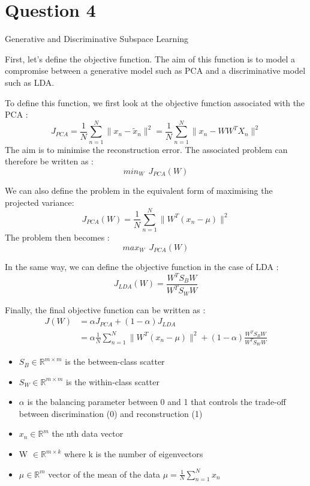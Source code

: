 
\section{Question 4} Generative and Discriminative Subspace Learning
\newline


First, let's define the objective function. The aim of this function is to model a compromise between a generative model such as PCA and a discriminative model such as LDA.

To define this function, we first look at the objective function associated with the PCA : 
$$ J_{PCA} = \frac{1}{N} \sum_{n = 1}^{N} {\lVert x_n - \tilde{x}_n \rVert ^2} = \frac{1}{N} \sum_{n = 1}^{N}{\lVert x_n - WW^TX_n \rVert^2} $$ 
The aim is to minimise the reconstruction error.  The associated problem can therefore be written as : 
$$ min_W\ \ J_{PCA}(W) $$

We can also define the problem in the equivalent form of maximising the projected variance:
$$ J_{PCA}(W) =  \frac{1}{N} \sum_{n = 1}^{N}{\lVert W^T(x_n - \mu) \rVert^2} $$
The problem then becomes : 
$$ max_W\ \ J_{PCA}(W) $$

In the same way, we can define the objective function in the case of LDA :
$$ J_{LDA}(W) = \dfrac{W^TS_BW}{W^TS_WW} $$

Finally, the final objective function can be written as :
\begin{align*}
	J(W) &= \alpha J_{PCA} + (1 - \alpha) J_{LDA} \\
	&= \alpha \frac{1}{N} \sum_{n = 1}^{N} \lVert W^T(x_n - \mu) \rVert^2 + (1 - \alpha) \frac{W^T S_B W}{W^T S_W W}
\end{align*}

\begin{itemize}
	\item $S_B \in \mathbb{R}^{m \times m}$ is the between-class scatter
	\item $S_W \in \mathbb{R}^{m \times m}$ is the within-class scatter
	\item $\alpha$ is the balancing parameter between 0 and 1 that controls the trade-off between discrimination (0) and reconstruction (1)
	\item $x_n \in \mathbb{R}^{m}$ the nth data vector
	\item W $\in \mathbb{R}^{m \times k}$  where k is the number of eigenvectors
	\item $\mu \in \mathbb{R}^{m}$ vector of the mean of the data  $\mu = \frac{1}{N} \sum_{n = 1}^{N} x_n $ 
\end{itemize}

